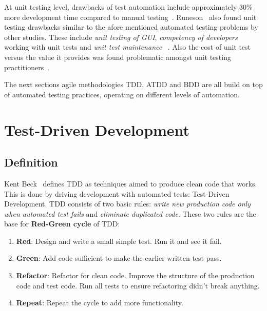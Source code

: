     At unit testing level, drawbacks of test automation include approximately 30\% more development time compared to manual testing~\cite{williams2009effectiveness}.
    Runeson~\cite{runeson2006survey} also found unit testing drawbacks similar to the afore mentioned automated testing problems by other studies.
    These include \textit{unit testing of GUI}, \textit{competency of developers} working with unit tests and \textit{unit test maintenance}~\cite{runeson2006survey} .
    Also the cost of unit test versus the value it provides was found problematic amongst unit testing practitioners~\cite{runeson2006survey}.

    The next sections agile methodologies TDD, ATDD and BDD are all build on top of automated testing practices, operating on different levels
    of automation.

\section{Test-Driven Development} %
    \subsection{Definition}
    Kent Beck~\cite{beck2003test} defines TDD as techniques aimed to produce clean code that works.
    This is done by driving development with automated tests: Test-Driven Development. TDD consists of two basic rules:
    \textit{write new production code only when automated test fails} and
    \textit{eliminate duplicated code}. These two rules are the base for \textbf{Red-Green cycle} of TDD:

    \begin{enumerate}
    \item \textbf{Red}: Design and write a small simple test. Run it and see it fail.
    \item \textbf{Green}: Add code sufficient to make the earlier written test pass.
    \item \textbf{Refactor}: Refactor for clean code. Improve the structure of the production code and test code.
    Run all tests to ensure refactoring didn't break anything.
    \item \textbf{Repeat}: Repeat the cycle to add more functionality.
    \end{enumerate}

